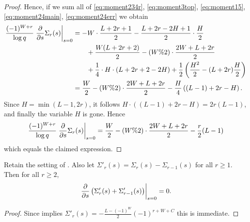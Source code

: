 \begin{proof}
  Hence, if we sum all of \eqref{eq:moment234r}, \eqref{eq:moment3top},
  \eqref{eq:moment15}, \eqref{eq:moment24main}, \eqref{eq:moment24err} we obtain
  \begin{align*}
    \frac{(-1)^{W+r}}{\log q} \left. \pdv{}{s} \Sigma_r(s) \right\rvert_{s=0}
    &= - W \cdot \frac{L+2r+1}{2} - \frac{L+2r-2H+1}{2} \cdot \frac H2 \\
    &\qquad+ \frac{W(L+2r+2)}{2} - (W\%2) \cdot \frac{2W+L+2r}{2} \\
    &\qquad+ \frac14 \cdot H \cdot (L + 2r + 2 - 2H) + \frac{1}{2} \left( \frac{H^2}{2} - (L+2r) \frac H2 \right) \\
    &= \frac{W}{2} - (W\%2) \cdot \frac{2W+L+2r}{2} - \frac{H}{4} \left( (L-1) + 2r - H  \right).
  \end{align*}
  Since $H = \min(L-1, 2r)$, it follows $H \cdot \left( (L-1)+2r-H \right) = 2r(L-1)$,
  and finally the variable $H$ is gone.
  Hence
  \[ \frac{(-1)^{W+r}}{\log q} \left. \pdv{}{s} \Sigma_r(s) \right\rvert_{s=0}
    = \frac{W}{2} - (W\%2) \cdot \frac{2W+L+2r}{2} - \frac r2 (L-1) \]
  which equals the claimed expression.
\end{proof}

\begin{corollary}
  \label{cor:derivative_cc}
  Retain the setting of .
  Also let $\Sigma'_r(s) = \Sigma_r(s) - \Sigma_{r-1}(s)$ for all $r \ge 1$.
  Then for all $r \ge 2$,
  \[ \left. \pdv{}{s}
      \left( \Sigma'_r(s) + \Sigma'_{r-1}(s) \right)
      \right\rvert_{s=0} = 0. \]
\end{corollary}
\begin{proof}
  Since  implies $\Sigma'_r(s) = - \frac{L - (-1)^W}{2} (-1)^{r+W+C}$
  this is immediate.
\end{proof}

